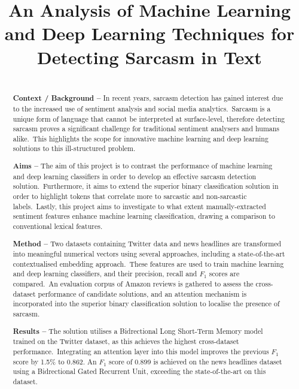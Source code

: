 \documentclass[12pt,a4paper]{article}
\title{An Analysis of Machine Learning and Deep Learning Techniques for Detecting Sarcasm in Text}
\author{} %
\date{}
\begin{document}
	
\maketitle

\begin{abstract}
\\ \noindent \textbf{Context / Background --} 
In recent years, sarcasm detection has gained interest due to the increased use of sentiment analysis and social media analytics.\ Sarcasm is a unique form of language that cannot be interpreted at surface-level, therefore detecting sarcasm proves a significant challenge for traditional sentiment analysers and humans alike.\ This highlights the scope for innovative machine learning and deep learning solutions to this ill-structured problem.\vspace{5pt}

\noindent \textbf{Aims --} The aim of this project is to contrast the performance of machine learning and deep learning classifiers in order to develop an effective sarcasm detection solution.\ Furthermore, it aims to extend the superior binary classification solution in order to highlight tokens that correlate more to sarcastic and non-sarcastic labels.\ Lastly, this project aims to investigate to what extent manually-extracted sentiment features enhance machine learning classification, drawing a comparison to conventional lexical features. \vspace{5pt}

\noindent \textbf{Method --} Two datasets containing Twitter data and news headlines are transformed into meaningful numerical vectors using several approaches, including a state-of-the-art contextualised embedding approach.\ These features are used to train machine learning and deep learning classifiers, and their precision, recall and $F_1$ scores are compared.\ An evaluation corpus of Amazon reviews is gathered to assess the cross-dataset performance of candidate solutions, and an attention mechanism is incorporated into the superior binary classification solution to localise the presence of sarcasm.\vspace{5pt}

\noindent \textbf{Results --} The solution utilises a Bidrectional Long Short-Term Memory model trained on the Twitter dataset, as this achieves the highest cross-dataset performance.\ Integrating an attention layer into this model improves the previous $F_1$ score by 1.5\% to 0.862. An $F_1$ score of 0.899 is achieved on the news headlines dataset using a Bidrectional Gated Recurrent Unit, exceeding the state-of-the-art on this dataset.\vspace{5pt}


\end{abstract}
\end{document}
